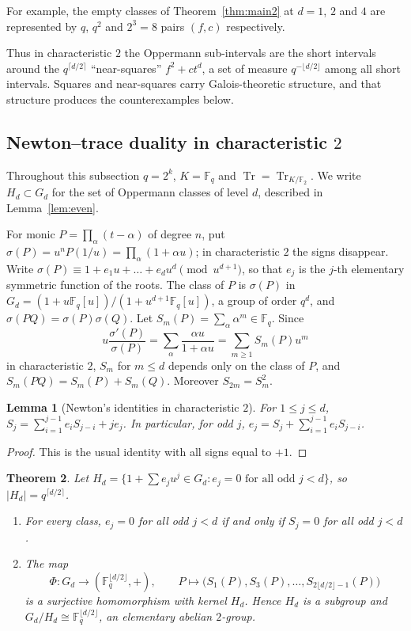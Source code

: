 \documentclass[11pt,a4paper]{amsart}
\newtheorem{theorem}{Theorem}[section]
\newtheorem{lemma}[theorem]{Lemma}
\theoremstyle{definition}
\theoremstyle{remark}
\newcommand{\F}{\mathbb{F}}
\newcommand{\Tr}{\operatorname{Tr}}
\begin{document}
For example, the empty classes of Theorem~\ref{thm:main2} at $d=1$, $2$ and $4$ are represented by $q$, $q^2$ and
$2^3=8$ pairs $(f,c)$ respectively.

Thus in characteristic $2$ the Oppermann sub-intervals are the short intervals around the $q^{\lceil d/2\rceil}$
``near-squares'' $f^2+ct^d$, a set of measure $q^{-\lfloor d/2\rfloor}$ among all short intervals. Squares and
near-squares carry Galois-theoretic structure, and that structure produces the counterexamples below.

\subsection{Newton--trace duality in characteristic \texorpdfstring{$2$}{2}}\label{subsec:newton}
Throughout this subsection $q=2^k$, $K=\F_q$ and $\Tr=\Tr_{K/\F_2}$. We write $H_d\subset G_d$ for the set of
Oppermann classes of level $d$, described in Lemma~\ref{lem:even}.

For monic $P=\prod_\alpha(t-\alpha)$ of degree $n$, put $\sigma(P)=u^nP(1/u)=\prod_\alpha(1+\alpha u)$; in
characteristic $2$ the signs disappear. Write $\sigma(P)\equiv1+e_1u+\dots+e_du^d\pmod{u^{d+1}}$, so that $e_j$ is the
$j$-th elementary symmetric function of the roots. The class of $P$ is $\sigma(P)$ in
$G_d=(1+u\F_q[u])/(1+u^{d+1}\F_q[u])$, a group of order $q^d$, and $\sigma(PQ)=\sigma(P)\sigma(Q)$. Let
$S_m(P)=\sum_\alpha\alpha^m\in\F_q$. Since
\[
u\frac{\sigma'(P)}{\sigma(P)}=\sum_\alpha\frac{\alpha u}{1+\alpha u}=\sum_{m\ge1}S_m(P)u^m
\]
in characteristic $2$, $S_m$ for $m\le d$ depends only on the class of $P$, and $S_m(PQ)=S_m(P)+S_m(Q)$. Moreover
$S_{2m}=S_m^2$.

\begin{lemma}[Newton's identities in characteristic $2$]\label{lem:newton}
For $1\le j\le d$, $S_j=\sum_{i=1}^{j-1}e_iS_{j-i}+je_j$. In particular, for odd $j$,
$e_j=S_j+\sum_{i=1}^{j-1}e_iS_{j-i}$.
\end{lemma}

\begin{proof}
This is the usual identity with all signs equal to $+1$.
\end{proof}

\begin{theorem}\label{thm:group}
Let $H_d=\{1+\sum e_ju^j\in G_d: e_j=0\text{ for all odd }j<d\}$, so $|H_d|=q^{\lceil d/2\rceil}$.
\begin{enumerate}
\item For every class, $e_j=0$ for all odd $j<d$ if and only if $S_j=0$ for all odd $j<d$.
\item The map
\[
\Phi:G_d\to(\F_q^{\lfloor d/2\rfloor},+),\qquad P\mapsto\bigl(S_1(P),S_3(P),\dots,S_{2\lfloor d/2\rfloor-1}(P)\bigr)
\]
is a surjective homomorphism with kernel $H_d$. Hence $H_d$ is a subgroup and $G_d/H_d\cong\F_q^{\lfloor d/2\rfloor}$, an
elementary abelian $2$-group.
\end{enumerate}
\end{theorem}
\end{document}
